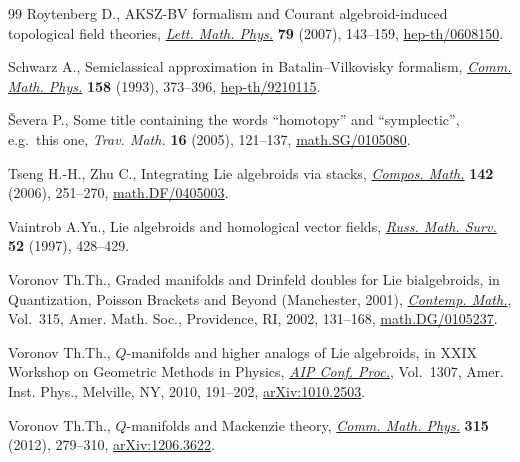 \documentclass[pdftex]{sigma}
\numberwithin{equation}{section}
\begin{document}
\begin{thebibliography}{99}
Roytenberg D., A{KSZ}-{BV} formalism and {C}ourant algebroid-induced
  topological f\/ield theories, \href{http://dx.doi.org/10.1007/s11005-006-0134-y}{\textit{Lett. Math. Phys.}} \textbf{79} (2007),
  143--159, \href{http://arxiv.org/abs/hep-th/0608150}{hep-th/0608150}.

Schwarz A., Semiclassical approximation in {B}atalin--{V}ilkovisky formalism,
  \href{http://dx.doi.org/10.1007/BF02108080}{\textit{Comm. Math. Phys.}} \textbf{158} (1993), 373--396,
  \href{http://arxiv.org/abs/hep-th/9210115}{hep-th/9210115}.

{\v{S}}evera P., Some title containing the words ``homotopy'' and
  ``symplectic'', e.g.~this one, \textit{Trav. Math.} \textbf{16} (2005),
  121--137, \href{http://arxiv.org/abs/math.SG/0105080}{math.SG/0105080}.

Tseng H.-H., Zhu C., Integrating {L}ie algebroids via stacks, \href{http://dx.doi.org/10.1112/S0010437X05001752}{\textit{Compos.
  Math.}} \textbf{142} (2006), 251--270, \href{http://arxiv.org/abs/math.DF/0405003}{math.DF/0405003}.

Vaintrob A.Yu., Lie algebroids and homological vector f\/ields, \href{http://dx.doi.org/10.1070/RM1997v052n02ABEH001802}{\textit{Russ.
  Math. Surv.}} \textbf{52} (1997), 428--429.

Voronov Th.Th., Graded manifolds and {D}rinfeld doubles for {L}ie bialgebroids,
  in Quantization, {P}oisson Brackets and Beyond ({M}anchester, 2001),
  \href{http://dx.doi.org/10.1090/conm/315/05478}{\textit{Contemp. Math.}}, Vol.~315, Amer. Math. Soc., Providence, RI, 2002,
  131--168, \href{http://arxiv.org/abs/math.DG/0105237}{math.DG/0105237}.

Voronov Th.Th., {$Q$}-manifolds and higher analogs of {L}ie algebroids, in X{XIX}
  {W}orkshop on {G}eometric {M}ethods in {P}hysics, \href{http://dx.doi.org/10.1063/1.3527417}{\textit{AIP Conf. Proc.}},
  Vol.~1307, Amer. Inst. Phys., Melville, NY, 2010, 191--202,
  \href{http://arxiv.org/abs/1010.2503}{arXiv:1010.2503}.

Voronov Th.Th., {$Q$}-manifolds and {M}ackenzie theory, \href{http://dx.doi.org/10.1007/s00220-012-1568-y}{\textit{Comm. Math.
  Phys.}} \textbf{315} (2012), 279--310, \href{http://arxiv.org/abs/1206.3622}{arXiv:1206.3622}.

\end{thebibliography}\LastPageEnding
\end{document}
